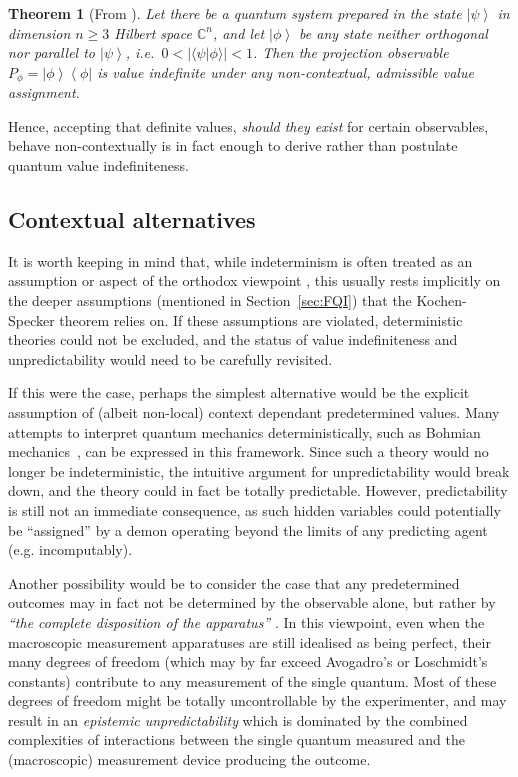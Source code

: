 \documentclass[%
 superscriptaddress,
 preprint,
 showpacs,
 showkeys,
 preprintnumbers,
 nofootinbib,
  amsmath,amssymb,
  aps,
 pra,
  longbibliography,
  floatfix,
 ]{revtex4-1}
\newtheorem{theorem}{Theorem}
\theoremstyle{definition}
\newcommand{\C}{\mathbb{C}}%
\newcommand{\bra}[1]{\left< #1 \right|}
\newcommand{\ket}[1]{\left| #1 \right>}
\newcommand{\iprod}[2]{\langle #1 | #2 \rangle}
\begin{document}
\begin{theorem}[From \cite{2012-incomput-proofsCJ,PhysRevA.89.032109}]
	\label{thm:vi-everywhere}
		Let there be a quantum system prepared in the state
	$\ket{\psi}$ in dimension $n\ge 3$ Hilbert space $\C^n$, and let $\ket{\phi}$ be any state neither orthogonal nor parallel to $\ket{\psi}$, i.e.\ $0<|\iprod{\psi}{\phi}|<1$.
	Then the projection observable $P_\phi=\ket{\phi}\bra{\phi}$ is value indefinite under any non-contextual, admissible value assignment.
\end{theorem}

Hence,  accepting that definite values, \emph{should they exist} for certain observables, behave non-contextually is in fact enough to derive rather than postulate quantum value indefiniteness.


\subsection{Contextual alternatives}
\label{sec:ac}

It is worth keeping in mind that, while indeterminism is often treated as an assumption or aspect of the orthodox viewpoint \cite{born-26-1,zeil-05_nature_ofQuantum}, this usually rests implicitly on the deeper assumptions (mentioned in
Section~\ref{sec:FQI})  that the Kochen-Specker theorem relies on.
If these assumptions are violated, deterministic theories could not be excluded, and the status of value indefiniteness and unpredictability would need to be carefully revisited.

If this were the case, perhaps the simplest alternative would be the explicit assumption of (albeit non-local) context dependant predetermined values.
Many attempts to interpret quantum mechanics deterministically, such as Bohmian mechanics~\cite{Bohm52}, can be expressed in this framework.
Since such a theory would no longer be indeterministic, the intuitive argument for unpredictability would break down, and the theory could in fact be totally predictable.
However, predictability is still not an immediate consequence, as such hidden variables could potentially be ``assigned'' by a demon operating beyond the limits of any predicting agent (e.g. incomputably).

Another possibility would be to consider the case that any predetermined outcomes may in fact not be determined by the observable alone, but rather by \emph{``the complete disposition  of the apparatus''} \cite[Sec.~5]{bell-66}.
In this viewpoint, even when the macroscopic measurement apparatuses are still idealised as being perfect, their many degrees of freedom (which may by far exceed Avogadro's  or Loschmidt's constants) contribute to any measurement of the single quantum.
Most of these degrees of freedom might be totally uncontrollable by the experimenter, and may result in an \emph{epistemic unpredictability} which is dominated by the combined complexities of interactions between the single quantum measured and the (macroscopic) measurement device producing the outcome.
\end{document}
